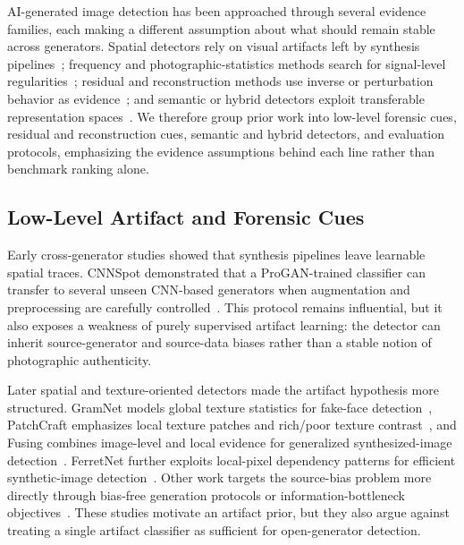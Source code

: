 \documentclass[lettersize,journal]{IEEEtran}
\begin{document}
AI-generated image detection has been approached through several evidence families, each making a different assumption about what should remain stable across generators. Spatial detectors rely on visual artifacts left by synthesis pipelines~\cite{wang2020cnnspot,liu2020gramnet,zhong2023patchcraft}; frequency and photographic-statistics methods search for signal-level regularities~\cite{frank2020frequency,liu2022realimages,zhong2025beyond}; residual and reconstruction methods use inverse or perturbation behavior as evidence~\cite{tan2023lgrad,tan2024npr,wang2023dire}; and semantic or hybrid detectors exploit transferable representation spaces~\cite{radford2021clip,ojha2023univfd,yan2025aide,cheng2025cospy}. We therefore group prior work into low-level forensic cues, residual and reconstruction cues, semantic and hybrid detectors, and evaluation protocols, emphasizing the evidence assumptions behind each line rather than benchmark ranking alone.

\subsection{Low-Level Artifact and Forensic Cues}
Early cross-generator studies showed that synthesis pipelines leave learnable spatial traces. CNNSpot demonstrated that a ProGAN-trained classifier can transfer to several unseen CNN-based generators when augmentation and preprocessing are carefully controlled~\cite{wang2020cnnspot}. This protocol remains influential, but it also exposes a weakness of purely supervised artifact learning: the detector can inherit source-generator and source-data biases rather than a stable notion of photographic authenticity.

Later spatial and texture-oriented detectors made the artifact hypothesis more structured. GramNet models global texture statistics for fake-face detection~\cite{liu2020gramnet}, PatchCraft emphasizes local texture patches and rich/poor texture contrast~\cite{zhong2023patchcraft}, and Fusing combines image-level and local evidence for generalized synthesized-image detection~\cite{ju2022fusing}. FerretNet further exploits local-pixel dependency patterns for efficient synthetic-image detection~\cite{liang2025ferretnet}. Other work targets the source-bias problem more directly through bias-free generation protocols or information-bottleneck objectives~\cite{guillaro2025biasfree,zhang2025vibnet}. These studies motivate an artifact prior, but they also argue against treating a single artifact classifier as sufficient for open-generator detection.
\end{document}
